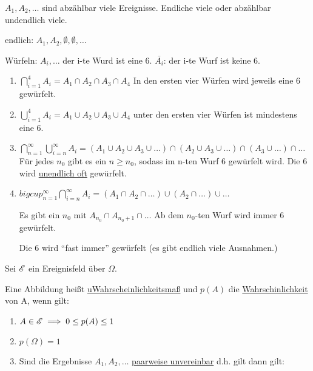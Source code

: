\documentclass{../tudscript}
\begin{document}
$A_1, A_2, \ldots$ sind abzählbar viele Ereignisse. Endliche viele oder abzählbar undendlich viele.

endlich: $A_1, A_2, \emptyset, \emptyset, \ldots$

Würfeln: $A_i, \ldots$ der i-te Wurd ist eine 6. $\bar{A_i}$: der i-te Wurf ist keine 6.

\begin{enumerate}
\item $\bigcap_{i = 1}^{4} A_i = A_1 \cap A_2 \cap A_3 \cap A_4$ In den ersten vier Würfen wird jeweils eine 6 gewürfelt.
\item $\bigcup_{i = 1}^4 A_i = A_1 \cup A_2 \cup A_3 \cup A_4$ unter den ersten vier Würfen ist mindestens eine 6.
\item $\bigcap_{n = 1}^{\infty} \bigcup_{i =n}^{\infty} A_i = (A_1 \cup A_2 \cup A_3 \cup \ldots) \cap (A_2 \cup A_3 \cup \ldots) \cap (A_3 \cup \ldots) \cap \ldots$
Für jedes $n_0$ gibt es ein $n \geq n_0$, sodass im n-ten Wurf 6 gewürfelt wird. Die 6 wird \underline{unendlich oft} gewürfelt.
\item $bigcup_{n = 1}^{\infty} \bigcap_{i = n}^{\infty} A_i = (A_1 \cap A_2 \cap \ldots) \cup (A_2 \cap \ldots) \cup \ldots$

Es gibt ein $n_0$ mit $A_{n_0} \cap A_{n_0 + 1} \cap \ldots$ Ab dem $n_0$-ten Wurf wird immer 6 gewürfelt.

Die 6 wird \enquote{fast immer} gewürfelt (es gibt endlich viele Ausnahmen.)

\end{enumerate}


Sei $\mathscr{E}$ ein Ereignisfeld über $\Omega$.

Eine Abbildung
heißt \underline{uWahrscheinlichkeitsmaß} und $p(A)$ die \underline{Wahrschinlichkeit} von A, wenn gilt:

\begin{enumerate}
\item $A \in \mathscr{E} \implies 0 \leq p(A) \leq 1$
\item $p(\Omega) = 1$
\item Sind die Ergebnisse $A_1, A_2, \ldots$ \underline{paarweise unvereinbar} d.h. gilt
dann gilt:
\end{enumerate}
\end{document}
